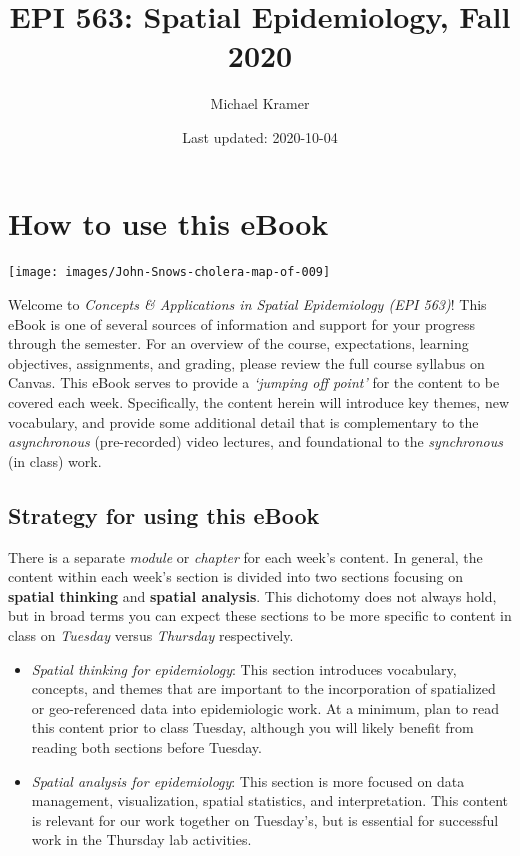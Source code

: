 \documentclass[
]{book}
\title{EPI 563: Spatial Epidemiology, Fall 2020}
\author{Michael Kramer}
\date{Last updated: 2020-10-04}
\providecommand{\tightlist}{%
  \setlength{\itemsep}{0pt}\setlength{\parskip}{0pt}}
\begin{document}
\maketitle

{
\setcounter{tocdepth}{1}
\tableofcontents
}
\hypertarget{how-to-use-this-ebook}{%
\chapter*{How to use this eBook}\label{how-to-use-this-ebook}}

\begin{center}\texttt{[image: images/John-Snows-cholera-map-of-009]} \end{center}

Welcome to \emph{Concepts \& Applications in Spatial Epidemiology (EPI 563)}! This eBook is one of several sources of information and support for your progress through the semester. For an overview of the course, expectations, learning objectives, assignments, and grading, please review the full course syllabus on Canvas. This eBook serves to provide a \emph{`jumping off point'} for the content to be covered each week. Specifically, the content herein will introduce key themes, new vocabulary, and provide some additional detail that is complementary to the \emph{asynchronous} (pre-recorded) video lectures, and foundational to the \emph{synchronous} (in class) work.

\hypertarget{strategy-for-using-this-ebook}{%
\section*{Strategy for using this eBook}\label{strategy-for-using-this-ebook}}

There is a separate \emph{module} or \emph{chapter} for each week's content. In general, the content within each week's section is divided into two sections focusing on \textbf{spatial thinking} and \textbf{spatial analysis}. This dichotomy does not always hold, but in broad terms you can expect these sections to be more specific to content in class on \emph{Tuesday} versus \emph{Thursday} respectively.

\begin{itemize}
\tightlist
\item
  \emph{Spatial thinking for epidemiology}: This section introduces vocabulary, concepts, and themes that are important to the incorporation of spatialized or geo-referenced data into epidemiologic work. At a minimum, plan to read this content prior to class Tuesday, although you will likely benefit from reading both sections before Tuesday.
\item
  \emph{Spatial analysis for epidemiology}: This section is more focused on data management, visualization, spatial statistics, and interpretation. This content is relevant for our work together on Tuesday's, but is essential for successful work in the Thursday lab activities.
\end{itemize}
\end{document}
